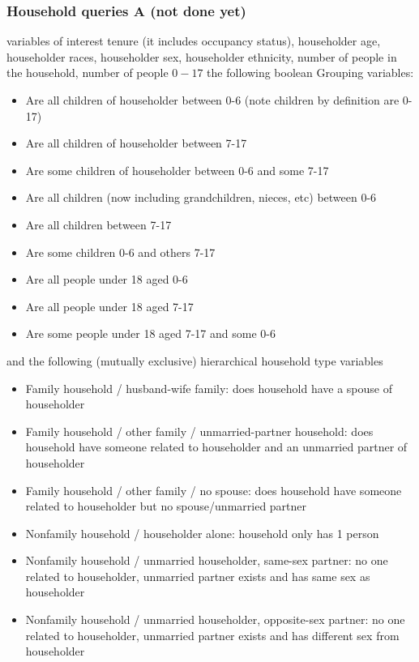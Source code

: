 \documentclass{amsart}
\begin{document}
{\subsubsection{Household queries A (not done yet)}\label{sec:milestone:workload:hqA}
variables of interest tenure (it includes  occupancy status), householder age, householder races, householder sex, householder ethnicity, number of people in the household, number of people $0-17$ the following boolean Grouping variables:
\begin{itemize}
\item Are all children of householder between 0-6 (note children by definition are 0-17)
\item Are all children of householder between 7-17
\item Are some children of householder between 0-6 and some 7-17 
\item Are all children (now including grandchildren, nieces, etc) between 0-6
\item Are all children between 7-17
\item Are some children 0-6 and others 7-17
\item Are all people under 18 aged 0-6
\item Are all people under 18 aged 7-17
\item Are some people under 18 aged 7-17 and some 0-6
\end{itemize}
and the following (mutually exclusive) hierarchical household type variables
\begin{itemize}
\item Family household / husband-wife family: does household have a spouse of householder
\item Family household / other family / unmarried-partner household: does household have someone related to householder and an unmarried partner of householder 
\item Family household / other family / no spouse: does household have someone related to householder but no spouse/unmarried partner
\item Nonfamily household / householder alone: household only has 1 person
\item Nonfamily household / unmarried householder, same-sex partner: no one related to householder, unmarried partner exists and has same sex as householder
\item Nonfamily household / unmarried householder, opposite-sex partner: no one related to householder, unmarried partner exists and has different sex from householder 

\end{itemize}}
\end{document}
